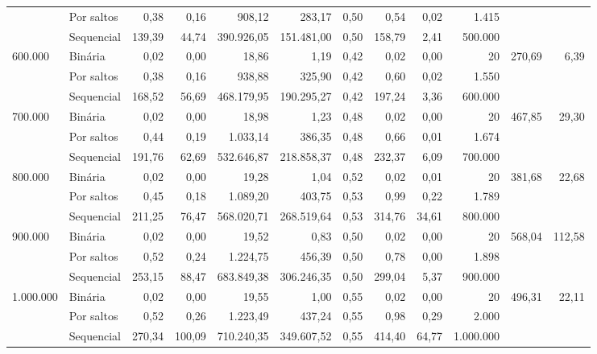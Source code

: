 \begin{tabular}{llrrrrrrrrrr}
 & Por saltos & 0,38 & 0,16 & 908,12 & 283,17 & 0,50 & 0,54 & 0,02 & 1.415 \\
 & Sequencial & 139,39 & 44,74 & 390.926,05 & 151.481,00 & 0,50 & 158,79 & 2,41 & 500.000 \\
\cline{1-12}
\multirow[c]{3}{*}{600.000} & Binária & 0,02 & 0,00 & 18,86 & 1,19 & 0,42 & 0,02 & 0,00 & 20 & \multirow[r]{3}{*}{270,69} & \multirow[r]{3}{*}{6,39} \\
 & Por saltos & 0,38 & 0,16 & 938,88 & 325,90 & 0,42 & 0,60 & 0,02 & 1.550 \\
 & Sequencial & 168,52 & 56,69 & 468.179,95 & 190.295,27 & 0,42 & 197,24 & 3,36 & 600.000 \\
\cline{1-12}
\multirow[c]{3}{*}{700.000} & Binária & 0,02 & 0,00 & 18,98 & 1,23 & 0,48 & 0,02 & 0,00 & 20 & \multirow[r]{3}{*}{467,85} & \multirow[r]{3}{*}{29,30} \\
 & Por saltos & 0,44 & 0,19 & 1.033,14 & 386,35 & 0,48 & 0,66 & 0,01 & 1.674 \\
 & Sequencial & 191,76 & 62,69 & 532.646,87 & 218.858,37 & 0,48 & 232,37 & 6,09 & 700.000 \\
\cline{1-12}
\multirow[c]{3}{*}{800.000} & Binária & 0,02 & 0,00 & 19,28 & 1,04 & 0,52 & 0,02 & 0,01 & 20 & \multirow[r]{3}{*}{381,68} & \multirow[r]{3}{*}{22,68} \\
 & Por saltos & 0,45 & 0,18 & 1.089,20 & 403,75 & 0,53 & 0,99 & 0,22 & 1.789 \\
 & Sequencial & 211,25 & 76,47 & 568.020,71 & 268.519,64 & 0,53 & 314,76 & 34,61 & 800.000 \\
\cline{1-12}
\multirow[c]{3}{*}{900.000} & Binária & 0,02 & 0,00 & 19,52 & 0,83 & 0,50 & 0,02 & 0,00 & 20 & \multirow[r]{3}{*}{568,04} & \multirow[r]{3}{*}{112,58} \\
 & Por saltos & 0,52 & 0,24 & 1.224,75 & 456,39 & 0,50 & 0,78 & 0,00 & 1.898 \\
 & Sequencial & 253,15 & 88,47 & 683.849,38 & 306.246,35 & 0,50 & 299,04 & 5,37 & 900.000 \\
\cline{1-12}
\multirow[c]{3}{*}{1.000.000} & Binária & 0,02 & 0,00 & 19,55 & 1,00 & 0,55 & 0,02 & 0,00 & 20 & \multirow[r]{3}{*}{496,31} & \multirow[r]{3}{*}{22,11} \\
 & Por saltos & 0,52 & 0,26 & 1.223,49 & 437,24 & 0,55 & 0,98 & 0,29 & 2.000 \\
 & Sequencial & 270,34 & 100,09 & 710.240,35 & 349.607,52 & 0,55 & 414,40 & 64,77 & 1.000.000 \\
\bottomrule
\end{tabular}